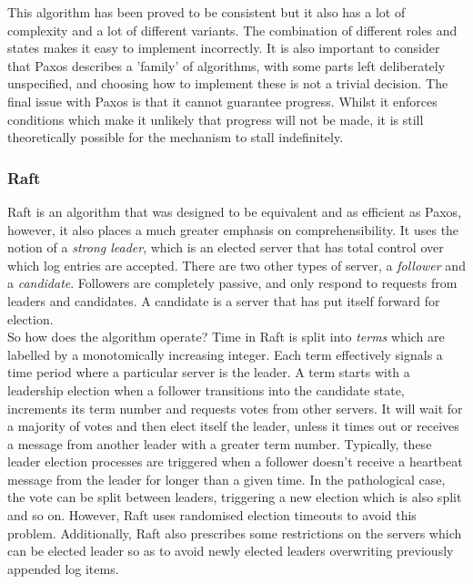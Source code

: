 \documentclass[12pt,a4paper,twoside,openright]{report}
\begin{document}
			This algorithm has been proved to be consistent but it also has a lot of complexity and a lot of different variants. 
			The combination of different roles and states makes it easy to implement incorrectly.
			It is also important to consider that Paxos describes a 'family' of algorithms, with some parts left deliberately unspecified, and choosing how to implement these is not a trivial decision.
			The final issue with Paxos is that it cannot guarantee progress.
			Whilst it enforces conditions which make it unlikely that progress will not be made, it is still theoretically possible for the mechanism to stall indefinitely.

			\subsubsection*{Raft}
			Raft \cite{Raft} is an algorithm that was designed to be equivalent and as efficient as Paxos, however, it also places a much greater emphasis on comprehensibility.
			It uses the notion of a \textit{strong leader}, which is an elected server that has total control over which log entries are accepted.
			There are two other types of server, a \textit{follower} and a \textit{candidate}. 
			Followers are completely passive, and only respond to requests from leaders and candidates. 
			A candidate is a server that has put itself forward for election.\\

			So how does the algorithm operate? 
			Time in Raft is split into \textit{terms} which are labelled by a monotomically increasing integer. 
			Each term effectively signals a time period where a particular server is the leader. 
			A term starts with a leadership election when a follower transitions into the candidate state, increments its term number and requests votes from other servers. 
			It will wait for a majority of votes and then elect itself the leader, unless it times out or receives a message from another leader with a greater term number. 
			Typically, these leader election processes are triggered when a follower doesn't receive a heartbeat message from the leader for longer than a given time.
			In the pathological case, the vote can be split between leaders, triggering a new election which is also split and so on.
			However, Raft uses randomised election timeouts to avoid this problem.
			Additionally, Raft also prescribes some restrictions on the servers which can be elected leader so as to avoid newly elected leaders overwriting previously appended log items.\\
			
\end{document}
